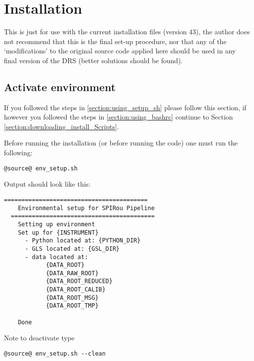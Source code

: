 \chapter{Installation}

This is just for use with the current installation files (version 43), the author does not recommend that this is the final set-up procedure, nor that any of the `modifications' to the original source code applied here should be used in any final version of the DRS (better solutions should be found). \\


\section{Activate environment}
\label{section:activate}

If you followed the steps in \ref{section:using_setup_sh} please follow this section, if however you followed the steps in \ref{section:using_bashrc} continue to Section \ref{section:downloading_install_Scripts}.

\noindent Before running the installation (or before running the code) one must run the following:
\begin{lstlisting}[style=bashstyle]
@source@ env_setup.sh
\end{lstlisting}

\noindent Output should look like this:
\begin{lstlisting}[style=bashstyle]
  =========================================
    Environmental setup for SPIRou Pipeline
  =========================================
    Setting up environment
    Set up for {INSTRUMENT}
      - Python located at: {PYTHON_DIR}
      - GLS located at: {GSL_DIR}
      - data located at:
            {DATA_ROOT}
            {DATA_RAW_ROOT}
            {DATA_ROOT_REDUCED}
            {DATA_ROOT_CALIB}
            {DATA_ROOT_MSG}
            {DATA_ROOT_TMP}

    Done
\end{lstlisting}

\noindent Note to deactivate type
\begin{lstlisting}[style=bashstyle]
@source@ env_setup.sh --clean
\end{lstlisting}


